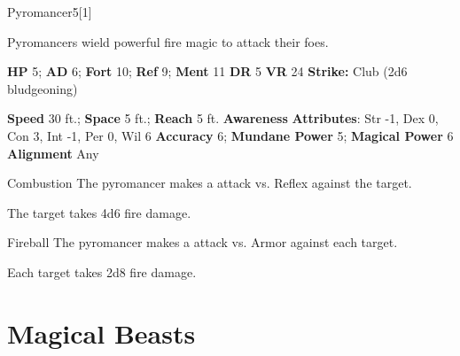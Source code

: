   \begin{monsection}{Pyromancer}{5}[1]
    \vspace{-1em}\vspace{-1em}
    \vspace{0em}

    
      Pyromancers wield powerful fire magic to attack their foes.
    
    

    \begin{spellcontent}
      \begin{spelltargetinginfo}
        \pari \textbf{HP} 5;
          \textbf{AD} 6;
          \textbf{Fort} 10;
          \textbf{Ref} 9;
          \textbf{Ment} 11
        \pari \textbf{DR} 5
        \pari \textbf{VR} 24
        \pari \textbf{Strike:}
            Club  (2d6 bludgeoning)
      \end{spelltargetinginfo}
    \end{spellcontent}
    \begin{monsterfooter}
      \pari \textbf{Speed} 30 ft.;
        \textbf{Space} 5 ft.;
        \textbf{Reach} 5 ft.
      \pari \textbf{Awareness} 
      \pari \textbf{Attributes}:
        Str -1, Dex 0,
        Con 3, Int -1,
        Per 0, Wil 6
      \pari \textbf{Accuracy} 6;
        \textbf{Mundane Power} 5;
      \textbf{Magical Power} 6
      \pari \textbf{Alignment} Any
    \end{monsterfooter}
  \end{monsection}
  \begin{freeability}{Combustion}
       The pyromancer makes a  attack
        vs. Reflex against the target.
    
    \hit The target takes 4d6 fire damage.
    \end{freeability}
  

    \begin{freeability}{Fireball}
       The pyromancer makes a  attack
        vs. Armor against each target.
    
    \hit Each target takes 2d8 fire damage.
    \end{freeability}
  
        \section{Magical Beasts}
      
